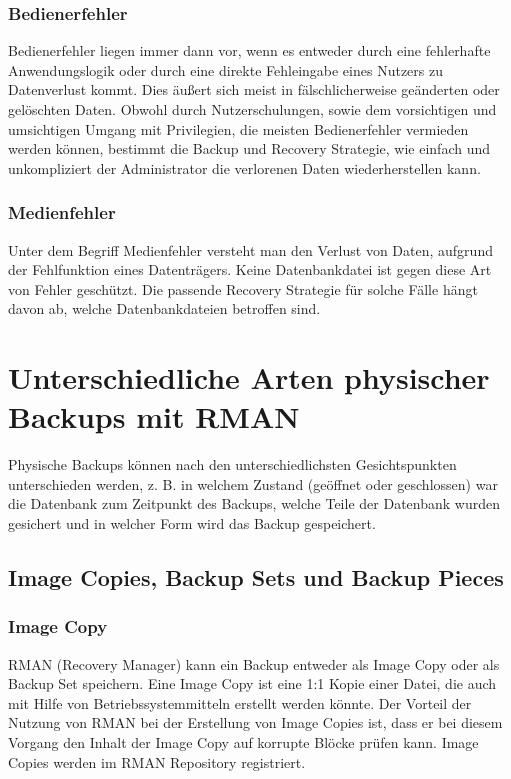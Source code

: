         \subsubsection{Bedienerfehler}
          Bedienerfehler liegen immer dann vor, wenn es entweder durch eine fehlerhafte Anwendungslogik oder durch eine direkte Fehleingabe eines Nutzers zu Datenverlust kommt. Dies äußert sich meist in fälschlicherweise geänderten oder gelöschten Daten. Obwohl durch Nutzerschulungen, sowie dem vorsichtigen und umsichtigen Umgang mit Privilegien, die meisten Bedienerfehler vermieden werden können, bestimmt die Backup und Recovery Strategie, wie einfach und unkompliziert der Administrator die verlorenen Daten wiederherstellen kann.
        \subsubsection{Medienfehler}
          Unter dem Begriff Medienfehler versteht man den Verlust von Daten, aufgrund der Fehlfunktion eines Datenträgers. Keine Datenbankdatei ist gegen diese Art von Fehler geschützt. Die passende Recovery Strategie für solche Fälle hängt davon ab, welche Datenbankdateien betroffen sind.
    \section{Unterschiedliche Arten physischer Backups mit RMAN}
      Physische Backups können nach den unterschiedlichsten Gesichtspunkten unterschieden werden, z. B. in welchem Zustand (geöffnet oder geschlossen) war die Datenbank zum Zeitpunkt des Backups, welche Teile der Datenbank wurden gesichert und in welcher Form wird das Backup gespeichert.

      \subsection{Image Copies, Backup Sets und Backup Pieces}
        \subsubsection{Image Copy}
          RMAN (Recovery Manager) kann ein Backup entweder als Image Copy oder als Backup Set speichern. Eine Image Copy ist eine 1:1 Kopie einer Datei, die auch mit Hilfe von Betriebssystemmitteln erstellt werden könnte. Der Vorteil der Nutzung von RMAN bei der Erstellung von Image Copies ist, dass er bei diesem Vorgang den Inhalt der Image Copy auf korrupte Blöcke prüfen kann. Image Copies werden im RMAN Repository registriert.

